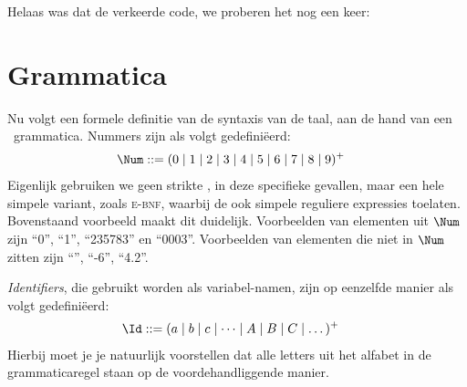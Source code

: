 Helaas was dat de verkeerde code, we proberen het nog een keer:



\section{Grammatica}

Nu volgt een formele definitie van de syntaxis van de taal, aan de hand van een \BNF\ grammatica. Nummers zijn als volgt gedefiniëerd:
\begin{align*}
  \Num \GrammarDef (0 \mid 1 \mid 2 \mid 3 \mid 4 \mid 5 \mid 6 \mid 7 \mid 8 \mid 9)^+
\end{align*}
Eigenlijk gebruiken we geen strikte \BNF, in deze specifieke gevallen, maar een hele simpele variant, zoals \textsc{e-bnf}, waarbij de ook simpele reguliere expressies toelaten.%
Bovenstaand voorbeeld maakt dit duidelijk. Voorbeelden van elementen uit $\Num$ zijn ``0'', ``1'', ``235783'' en ``0003''. Voorbeelden van elementen die niet in $\Num$ zitten zijn ``'', ``-6'', ``4.2''.

\emph{Identifiers}, die gebruikt worden als variabel-namen,%
zijn op eenzelfde manier als volgt gedefiniëerd:
\begin{align*}
  \Id \GrammarDef (a \mid b \mid c \mid \dots \mid A \mid B \mid C \mid \dots)^+
\end{align*}
Hierbij moet je je natuurlijk%
voorstellen dat alle letters uit het alfabet in de grammaticaregel staan op de voordehandliggende%
manier.

